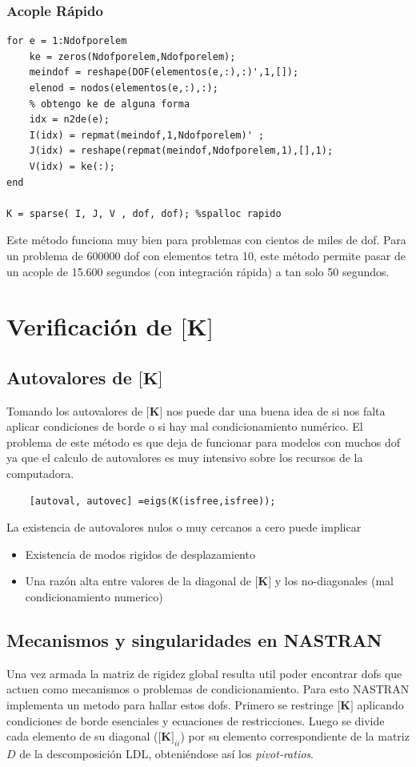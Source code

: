 \documentclass[11pt, a4paper,titlepage]{article}
\newcommand{\Mme}[1]{\boldsymbol{[}\mathbf{#1} \boldsymbol{]}}
\newcommand{\MK}{\Mme{K}}
\begin{document}
\subsubsection*{Acople Rápido}
\begin{verbatim}
for e = 1:Ndofporelem
    ke = zeros(Ndofporelem,Ndofporelem);
    meindof = reshape(DOF(elementos(e,:),:)',1,[]);
    elenod = nodos(elementos(e,:),:);
    % obtengo ke de alguna forma
    idx = n2de(e);
    I(idx) = repmat(meindof,1,Ndofporelem)' ;
    J(idx) = reshape(repmat(meindof,Ndofporelem,1),[],1);
    V(idx) = ke(:);
end

K = sparse( I, J, V , dof, dof); %spalloc rapido
\end{verbatim}

Este método funciona muy bien para problemas con cientos de miles de dof. Para un problema de 600000 dof con elementos tetra 10, este método permite pasar de un acople de 15.600 segundos (con integración rápida) a tan solo 50 segundos.

\section{Verificación de \(\MK \)}
\subsection*{Autovalores de $\MK$}
Tomando los autovalores de $\MK$ nos puede dar una buena idea de si nos falta aplicar condiciones de borde o si hay mal condicionamiento numérico. El problema de este método es que deja de funcionar para modelos con muchos dof ya que el calculo de autovalores es muy intensivo sobre los recursos de la computadora.
\begin{verbatim}
    [autoval, autovec] =eigs(K(isfree,isfree));
\end{verbatim}

La existencia de autovalores nulos o muy cercanos a cero puede implicar 
\begin{itemize}
    \item Existencia de modos rigidos de desplazamiento
    \item Una razón alta entre valores de la diagonal de $\MK$ y los no-diagonales (mal condicionamiento numerico)
\end{itemize}
\subsection*{Mecanismos y singularidades en NASTRAN}
Una vez armada la matriz de rigidez global resulta util poder encontrar dofs que actuen como mecanismos o problemas de condicionamiento. Para esto NASTRAN implementa un metodo para hallar estos dofs. Primero se restringe \(\MK \) aplicando condiciones de borde esenciales y ecuaciones de restricciones. Luego se divide cada elemento de su diagonal ($\MK_{ii}$) por su elemento correspondiente de la matriz $D$ de la descomposición LDL, obteniéndose así los \textit{pivot-ratios}.
\end{document}
